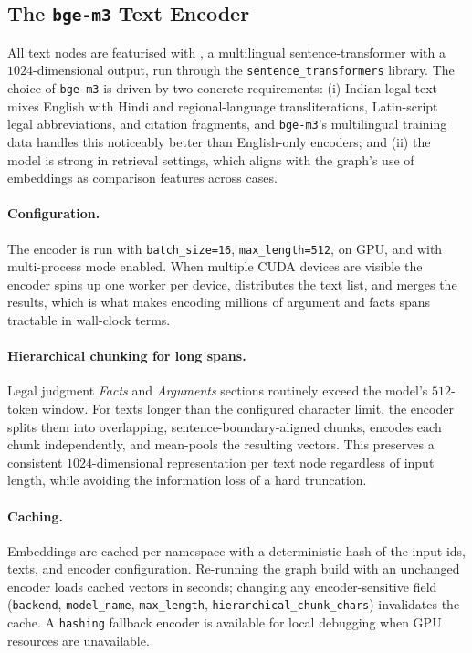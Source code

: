 \subsection{The \texttt{bge-m3} Text Encoder}

All text nodes are featurised with , a multilingual
sentence-transformer with a $1024$-dimensional output, run through the
\texttt{sentence\_transformers} library. The choice of \texttt{bge-m3}
is driven by two concrete requirements: (i) Indian legal text mixes
English with Hindi and regional-language transliterations, Latin-script
legal abbreviations, and citation fragments, and \texttt{bge-m3}'s
multilingual training data handles this noticeably better than
English-only encoders; and (ii) the model is strong in retrieval
settings, which aligns with the graph's use of embeddings as
comparison features across cases.

\paragraph{Configuration.} The encoder is run with
\texttt{batch\_size=16}, \texttt{max\_length=512}, on GPU, and with
multi-process mode enabled. When multiple CUDA devices are visible the
encoder spins up one worker per device, distributes the text list, and
merges the results, which is what makes encoding millions of argument
and facts spans tractable in wall-clock terms.

\paragraph{Hierarchical chunking for long spans.} Legal judgment
\emph{Facts} and \emph{Arguments} sections routinely exceed the
model's $512$-token window. For texts longer than the configured
character limit, the encoder splits them into overlapping,
sentence-boundary-aligned chunks, encodes each chunk independently,
and mean-pools the resulting vectors. This preserves a consistent
$1024$-dimensional representation per text node regardless of input
length, while avoiding the information loss of a hard truncation.

\paragraph{Caching.} Embeddings are cached per namespace with a
deterministic hash of the input ids, texts, and encoder configuration.
Re-running the graph build with an unchanged encoder loads cached
vectors in seconds; changing any encoder-sensitive field
(\texttt{backend}, \texttt{model\_name}, \texttt{max\_length},
\texttt{hierarchical\_chunk\_chars}) invalidates the cache. A
\texttt{hashing} fallback encoder is available for local debugging
when GPU resources are unavailable.

